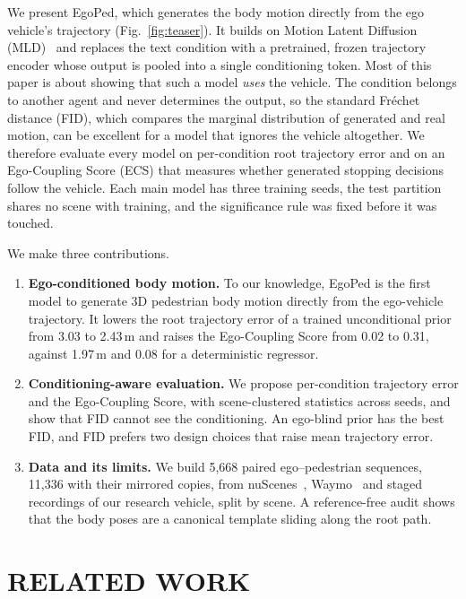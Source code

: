 \documentclass[letterpaper, 10 pt, conference]{ieeeconf}
\newcommand{\method}{EgoPed\xspace}
\begin{document}
We present \method, which generates the body motion directly from the ego vehicle's trajectory (Fig.~\ref{fig:teaser}).
It builds on Motion Latent Diffusion (MLD)~\cite{chen2023mld} and replaces the text condition with a pretrained, frozen trajectory encoder whose output is pooled into a single conditioning token.
Most of this paper is about showing that such a model \emph{uses} the vehicle.
The condition belongs to another agent and never determines the output, so the standard Fréchet distance (FID), which compares the marginal distribution of generated and real motion, can be excellent for a model that ignores the vehicle altogether.
We therefore evaluate every model on per-condition root trajectory error and on an Ego-Coupling Score (ECS) that measures whether generated stopping decisions follow the vehicle. Each main model has three training seeds, the test partition shares no scene with training, and the significance rule was fixed before it was touched.

We make three contributions.
\begin{enumerate}
\item \textbf{Ego-conditioned body motion.} To our knowledge, \method is the first model to generate 3D pedestrian body motion directly from the ego-vehicle trajectory. It lowers the root trajectory error of a trained unconditional prior from 3.03 to 2.43\,m and raises the Ego-Coupling Score from 0.02 to 0.31, against 1.97\,m and 0.08 for a deterministic regressor.
\item \textbf{Conditioning-aware evaluation.} We propose per-condition trajectory error and the Ego-Coupling Score, with scene-clustered statistics across seeds, and show that FID cannot see the conditioning. An ego-blind prior has the best FID, and FID prefers two design choices that raise mean trajectory error.
\item \textbf{Data and its limits.} We build 5{,}668 paired ego--pedestrian sequences, 11{,}336 with their mirrored copies, from nuScenes~\cite{caesar2020nuscenes}, Waymo~\cite{sun2020waymo} and staged recordings of our research vehicle, split by scene. A reference-free audit shows that the body poses are a canonical template sliding along the root path.
\end{enumerate}

\section{RELATED WORK}
\label{sec:related}
\end{document}
